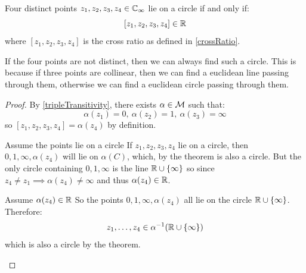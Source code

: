 \documentclass[../main.tex]{subfiles}
\begin{document}
\begin{corollary}
  Four distinct points $z_1, z_2, z_3, z_4 \in \mathbb{C}_{\infty}$ lie on a circle if and only if:
  \[
    [z_1, z_2, z_3, z_4] \in \mathbb{R}
  \]
  where $[z_1, z_2, z_3, z_4]$ is the cross ratio as defined in \cref{crossRatio}.
\end{corollary}
\begin{remark}
  If the four points are not distinct, then we can always find such a circle.
  This is because if three points are collinear, then we can find a euclidean line passing through them, otherwise we can find a euclidean circle passing through them.
\end{remark}
\begin{proof}
  By \cref{tripleTransitivity}, there exists $\alpha \in \mathcal{M}$ such that:
  \[
    \alpha(z_1) = 0,\ \alpha(z_2) = 1,\ \alpha(z_3) = \infty
  \]
  so $[z_1, z_2, z_3, z_4] = \alpha(z_4)$ by definition.
  \begin{proofdirection}{Assume the points lie on a circle}
    If $z_1, z_2, z_3, z_4$ lie on a circle, then $0, 1, \infty, \alpha(z_4)$ will lie on $\alpha(C)$, which, by the theorem is also a circle.
    But the only circle containing $0, 1, \infty$ is the line $\mathbb{R} \cup \{\infty\}$ so since $z_4 \neq z_1 \implies \alpha(z_4) \neq \infty$ and thus $\alpha(z_4) \in \mathbb{R}$.
  \end{proofdirection}
  \begin{proofdirection}{Assume $\alpha(z_4) \in \mathbb{R}$}
    So the points $0, 1, \infty, \alpha(z_4)$ all lie on the circle $\mathbb{R} \cup \{\infty\}$.
    Therefore:
    \[
      z_1, \ldots, z_4 \in \alpha^{-1} (\mathbb{R} \cup \{\infty\})
    \]
    which is also a circle by the theorem.
  \end{proofdirection}
\end{proof}
\end{document}
